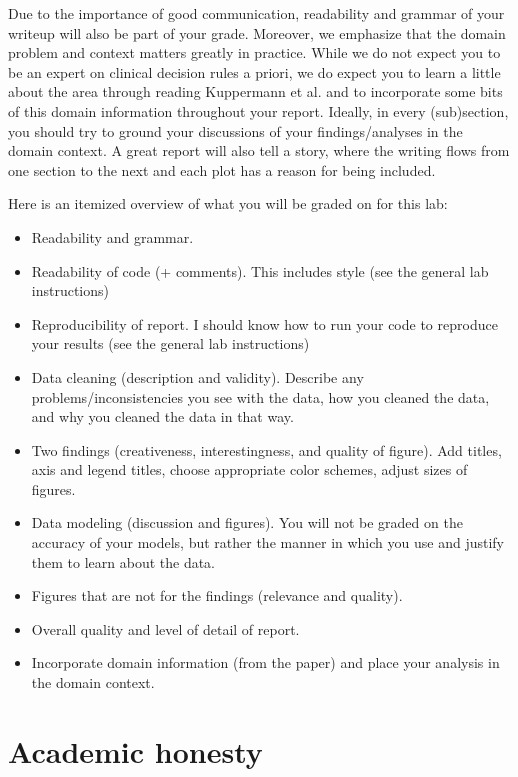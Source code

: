 \documentclass[10pt,letterpaper]{article}
\begin{document}
Due to the importance of good communication, readability and grammar of your writeup will also be part of your grade. Moreover, we emphasize that the domain problem and context matters greatly in practice. While we do not expect you to be an expert on clinical decision rules a priori, we do expect you to learn a little about the area through reading Kuppermann et al. and to incorporate some bits of this domain information throughout your report. Ideally, in every (sub)section, you should try to ground your discussions of your findings/analyses in the domain context. A great report will also tell a story, where the writing flows from one section to the next and each plot has a reason for being included.

Here is an itemized overview of what you will be graded on for this lab:
\begin{itemize}
    \item Readability and grammar.
    \item Readability of code (+ comments). This includes style (see the general lab instructions)
    \item Reproducibility of report. I should know how to run your code to reproduce your results (see the general lab instructions)
    \item Data cleaning (description and validity). Describe any problems/inconsistencies you see with the data, how you cleaned the data, and why you cleaned the data in that way.
    \item Two findings (creativeness, interestingness, and quality of figure). Add titles, axis and legend titles, choose appropriate color schemes, adjust sizes of figures.
    \item Data modeling (discussion and figures). You will not be graded on the accuracy of your models, but rather the manner in which you use and justify them to learn about the data. 
    \item Figures that are not for the findings (relevance and quality).
    \item Overall quality and level of detail of report.
    \item Incorporate domain information (from the paper) and place your analysis in the domain context.
\end{itemize}

\section*{Academic honesty}
\end{document}
